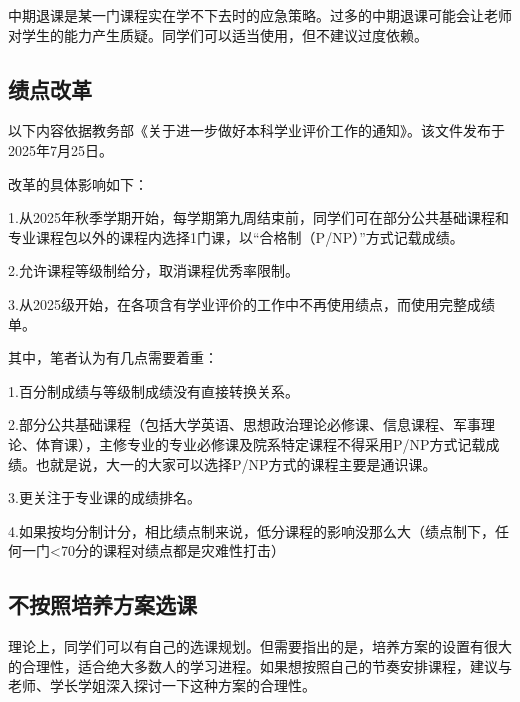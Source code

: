 \documentclass[11pt,oneside]{book}
\begin{document}
\vspace{10pt}

中期退课是某一门课程实在学不下去时的应急策略。过多的中期退课可能会让老师对学生的能力产生质疑。同学们可以适当使用，但不建议过度依赖。

\subsection{绩点改革}
以下内容依据教务部《关于进一步做好本科学业评价工作的通知》。该文件发布于2025年7月25日。

\vspace{10pt}

改革的具体影响如下：

\vspace{10pt}

1.从2025年秋季学期开始，每学期第九周结束前，同学们可在部分公共基础课程和专业课程包以外的课程内选择1门课，以“合格制（P/NP）”方式记载成绩。

\vspace{10pt}

2.允许课程等级制给分，取消课程优秀率限制。

\vspace{10pt}

3.从2025级开始，在各项含有学业评价的工作中不再使用绩点，而使用完整成绩单。

\vspace{10pt}

其中，笔者认为有几点需要着重：

\vspace{10pt}

1.百分制成绩与等级制成绩没有直接转换关系。

\vspace{10pt}

2.部分公共基础课程（包括大学英语、思想政治理论必修课、信息课程、军事理论、体育课），主修专业的专业必修课及院系特定课程不得采用P/NP方式记载成绩。也就是说，大一的大家可以选择P/NP方式的课程主要是通识课。

\vspace{10pt}

3.更关注于专业课的成绩排名。

\vspace{10pt}

4.如果按均分制计分，相比绩点制来说，低分课程的影响没那么大（绩点制下，任何一门<70分的课程对绩点都是灾难性打击）

\subsection{不按照培养方案选课}
理论上，同学们可以有自己的选课规划。但需要指出的是，培养方案的设置有很大的合理性，适合绝大多数人的学习进程。如果想按照自己的节奏安排课程，建议与老师、学长学姐深入探讨一下这种方案的合理性。
\end{document}
